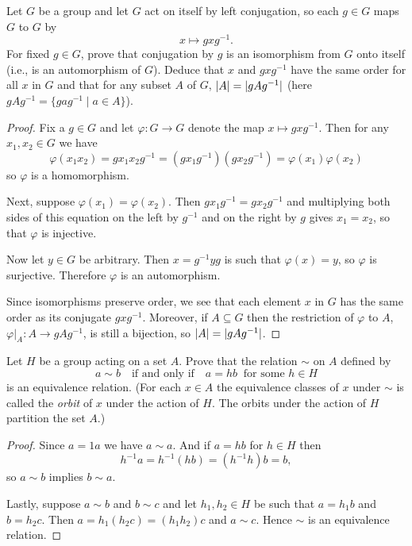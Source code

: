  Let $G$ be a group and let $G$ act on itself by left
conjugation, so each $g\in G$ maps $G$ to $G$ by
\begin{equation*}
  x\mapsto gxg^{-1}.
\end{equation*}
For fixed $g\in G$, prove that conjugation by $g$ is an isomorphism
from $G$ onto itself (i.e., is an automorphism of $G$). Deduce that
$x$ and $gxg^{-1}$ have the same order for all $x$ in $G$ and that for
any subset $A$ of $G$, $\lvert{A}\rvert = \lvert{gAg^{-1}}\rvert$ (here
$gAg^{-1} = \{gag^{-1}\mid a\in A\}$).
\begin{proof}
  Fix a $g\in G$ and let $\varphi\colon G\to G$ denote the map
  $x\mapsto gxg^{-1}$. Then for any $x_1,x_2\in G$ we have
  \begin{equation*}
    \varphi(x_1x_2) = gx_1x_2g^{-1}
    = (gx_1g^{-1})(gx_2g^{-1}) = \varphi(x_1)\varphi(x_2)
  \end{equation*}
  so $\varphi$ is a homomorphism.

  Next, suppose $\varphi(x_1) = \varphi(x_2)$. Then
  $gx_1g^{-1} = gx_2g^{-1}$ and multiplying both sides of this
  equation on the left by $g^{-1}$ and on the right by $g$ gives
  $x_1 = x_2$, so that $\varphi$ is injective.

  Now let $y\in G$ be arbitrary. Then $x = g^{-1}yg$ is such that
  $\varphi(x) = y$, so $\varphi$ is surjective. Therefore $\varphi$ is
  an automorphism.

  Since isomorphisms preserve order, we see that each element $x$ in
  $G$ has the same order as its conjugate $gxg^{-1}$. Moreover, if
  $A\subseteq G$ then the restriction of $\varphi$ to $A$,
  $\varphi|_A\colon A\to gAg^{-1}$, is still a bijection, so
  $\lvert{A}\rvert = \lvert{gAg^{-1}}\rvert$.
\end{proof}

 Let $H$ be a group acting on a set $A$. Prove that the
relation $\sim$ on $A$ defined by
\begin{equation*}
  a\sim b
  \quad\text{if and only if}\quad
  a = hb\;\;\text{for some $h\in H$}
\end{equation*}
is an equivalence relation. (For each $x\in A$ the equivalence classes
of $x$ under $\sim$ is called the {\em orbit} of $x$ under the action
of $H$. The orbits under the action of $H$ partition the set $A$.)
\begin{proof}
  Since $a = 1a$ we have $a\sim a$. And if $a = hb$ for $h\in H$ then
  \begin{equation*}
    h^{-1}a = h^{-1}(hb) = (h^{-1}h)b = b,
  \end{equation*}
  so $a\sim b$ implies $b\sim a$.

  Lastly, suppose $a\sim b$ and $b\sim c$ and let $h_1,h_2\in H$ be
  such that $a = h_1b$ and $b = h_2c$. Then
  $a = h_1(h_2c) = (h_1h_2)c$ and $a\sim c$. Hence $\sim$ is an
  equivalence relation.
\end{proof}

